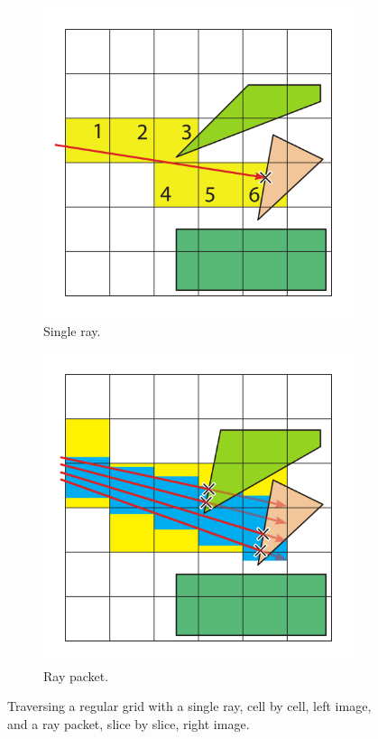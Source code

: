 \begin{figure}
	\centering
	\begin{subfigure}[t]{0.44\textwidth}
		\centering
		\includegraphics[width=\textwidth]{images/cell_traverser}
		\caption{Single ray.}
		\label{fig:cell_traverser}
	\end{subfigure}
	\begin{subfigure}[t]{0.44\textwidth}
		\centering
		\includegraphics[width=\textwidth]{images/slice_traverser}
		\caption{Ray packet.}
		\label{fig:slice_traverser}
	\end{subfigure}
	\caption{
		Traversing a regular grid with a single ray, cell by cell, left image, and a ray packet, slice by slice, right image.
	}
	\label{fig:traverser}
\end{figure}

